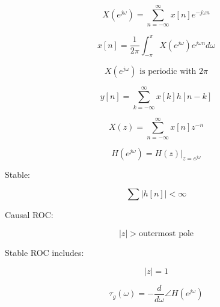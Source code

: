 \begin{tcolorbox}[title=One-Minute Revision,colback=blue!5]

\[
X(e^{j\omega})=
\sum_{n=-\infty}^{\infty}x[n]e^{-j\omega n}
\]

\[
x[n]=
\frac{1}{2\pi}
\int_{-\pi}^{\pi}
X(e^{j\omega})e^{j\omega n}d\omega
\]

\[
X(e^{j\omega})\text{ is periodic with }2\pi
\]

\[
y[n]=
\sum_{k=-\infty}^{\infty}
x[k]h[n-k]
\]

\[
X(z)=
\sum_{n=-\infty}^{\infty}x[n]z^{-n}
\]

\[
H(e^{j\omega})=H(z)|_{z=e^{j\omega}}
\]

Stable:

\[
\sum |h[n]|<\infty
\]

Causal ROC:

\[
|z|>\text{outermost pole}
\]

Stable ROC includes:

\[
|z|=1
\]

\[
\tau_g(\omega)=
-\frac{d}{d\omega}\angle H(e^{j\omega})
\]

\end{tcolorbox}
